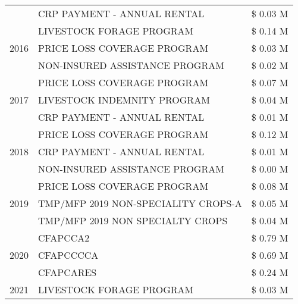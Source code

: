 \begin{tabular}{llr}
 & CRP PAYMENT - ANNUAL RENTAL & \$ 0.03 M \\
\cline{1-3}
\multirow[t]{3}{*}{2016} & LIVESTOCK FORAGE PROGRAM                      & \$ 0.14 M \\
 & PRICE LOSS COVERAGE PROGRAM                   & \$ 0.03 M \\
 & NON-INSURED ASSISTANCE PROGRAM                & \$ 0.02 M \\
\cline{1-3}
\multirow[t]{3}{*}{2017} & PRICE LOSS COVERAGE PROGRAM & \$ 0.07 M \\
 & LIVESTOCK INDEMNITY PROGRAM & \$ 0.04 M \\
 & CRP PAYMENT - ANNUAL RENTAL & \$ 0.01 M \\
\cline{1-3}
\multirow[t]{3}{*}{2018} & PRICE LOSS COVERAGE PROGRAM & \$ 0.12 M \\
 & CRP PAYMENT - ANNUAL RENTAL & \$ 0.01 M \\
 & NON-INSURED ASSISTANCE PROGRAM & \$ 0.00 M \\
\cline{1-3}
\multirow[t]{3}{*}{2019} & PRICE LOSS COVERAGE PROGRAM & \$ 0.08 M \\
 & TMP/MFP 2019 NON-SPECIALITY CROPS-A & \$ 0.05 M \\
 & TMP/MFP 2019 NON SPECIALTY CROPS & \$ 0.04 M \\
\cline{1-3}
\multirow[t]{3}{*}{2020} & CFAPCCA2 & \$ 0.79 M \\
 & CFAPCCCCA & \$ 0.69 M \\
 & CFAPCARES & \$ 0.24 M \\
\cline{1-3}
2021 & LIVESTOCK FORAGE PROGRAM & \$ 0.03 M \\
\cline{1-3}
\bottomrule
\end{tabular}
